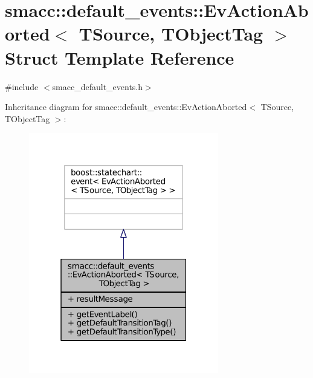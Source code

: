 \hypertarget{structsmacc_1_1default__events_1_1EvActionAborted}{}\section{smacc\+:\+:default\+\_\+events\+:\+:Ev\+Action\+Aborted$<$ T\+Source, T\+Object\+Tag $>$ Struct Template Reference}
\label{structsmacc_1_1default__events_1_1EvActionAborted}


{\ttfamily \#include $<$smacc\+\_\+default\+\_\+events.\+h$>$}



Inheritance diagram for smacc\+:\+:default\+\_\+events\+:\+:Ev\+Action\+Aborted$<$ T\+Source, T\+Object\+Tag $>$\+:
\nopagebreak
\begin{figure}[H]
\begin{center}
\leavevmode
\includegraphics[width=235pt]{structsmacc_1_1default__events_1_1EvActionAborted__inherit__graph}
\end{center}
\end{figure}



